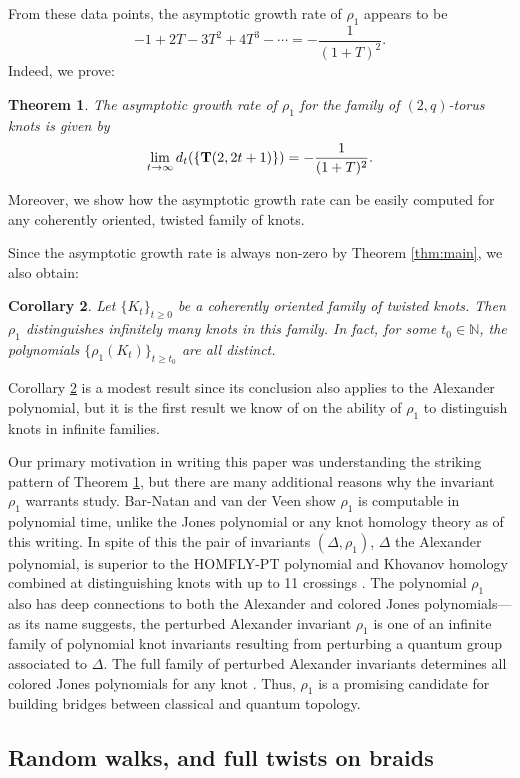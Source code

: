 \documentclass[11pt,hyp,]{nyjm}
\newcommand{\N}{\mathbb{N}}
\newtheorem{thm}{Theorem}
\numberwithin{thm}{section}
\newtheorem{cor}[thm]{Corollary}
\theoremstyle{definition}
\theoremstyle{remark}
\begin{document}
	From these data points, the asymptotic growth rate of $\rho_1$ appears to be
	$$
		-1 + 2T - 3T^2 + 4T^3 - \cdots =-\frac{1}{(1 + T)^2}.
	$$
	Indeed, we prove:
	\begin{thm}
		\label{thm:example}
		The asymptotic growth rate of $\rho_1$ for the family of $(2,q)$-torus knots is given by
		$$
		\lim_{t \to \infty} d_t(\{{\bf T}(2, 2t + 1)\}) = -\frac{1}{(1 + T)^2}.
		$$ 
	\end{thm}
	Moreover, we show how the asymptotic growth rate can be easily computed for any coherently oriented, twisted family of knots.
	
	Since the asymptotic growth rate is always non-zero by Theorem \ref{thm:main}, we also obtain:
	\begin{cor}
		\label{cor:distinguishing}
		Let $\{K_t\}_{t \geq 0}$ be a coherently oriented family of twisted knots. Then $\rho_1$ distinguishes infinitely many knots in this family. In fact, for some $t_0 \in \N$, the polynomials $\{\rho_1(K_t)\}_{t \geq t_0}$ are all distinct.
	\end{cor}
	Corollary \ref{cor:distinguishing} is a modest result since its conclusion also applies to the Alexander polynomial, but it is the first result we know of on the ability of $\rho_1$ to distinguish knots in infinite families.
	
	Our primary motivation in writing this paper was understanding the striking pattern of Theorem \ref{thm:example}, but there are many additional reasons why the invariant $\rho_1$ warrants study. Bar-Natan and van der Veen show $\rho_1$ is computable in polynomial time, unlike the Jones polynomial or any knot homology theory as of this writing. In spite of this the pair of invariants $(\Delta, \rho_1)$, $\Delta$ the Alexander polynomial, is superior to the HOMFLY-PT polynomial and Khovanov homology combined at distinguishing knots with up to 11 crossings \cite{bnvdv22}\cite[Theorem 50]{bnvdv21}. The polynomial $\rho_1$ also has deep connections to both the Alexander and colored Jones polynomials---as its name suggests, the perturbed Alexander invariant $\rho_1$ is one of an infinite family of polynomial knot invariants resulting from perturbing a quantum group associated to $\Delta$. The full family of perturbed Alexander invariants determines all colored Jones polynomials for any knot \cite{bnvdv21}. Thus, $\rho_1$ is a promising candidate for building bridges between classical and quantum topology.
	
	\subsection{Random walks, and full twists on braids}
	
\end{document}
